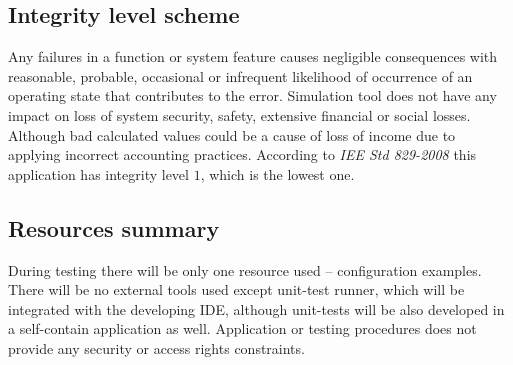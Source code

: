 \subsection{Integrity level scheme} \label{s:introduction:integrity-level-scheme}
	\begin{comment}
		$<$Describe the identified integrity level scheme for the software-based system or software product, and the mapping of the selected scheme to the integrity level scheme used in this standard. If the selected integrity level scheme is the example presented in this standard, it may be referenced and does not need to be repeated in the MTP. The MTP documents the assignment of integrity levels to individual components (e.g., requirements, functions, software modules, subsystems, non-functional characteristics, or other partitions), where there are differing integrity levels assigned within the system. At the beginning of each process, the assignment of integrity levels is reassessed with respect to changes that may need to be made in the integrity levels as a result of architecture selection, design choices, code construction, or other development activities. $>$
	\end{comment}
	Any failures in a function or system feature causes negligible consequences with reasonable, probable, occasional or infrequent likelihood of occurrence of an operating state that contributes to the error. Simulation tool does not have any impact on loss of system security, safety, extensive financial or social losses. Although bad calculated values could be a cause of loss of income due to applying incorrect accounting practices. According to \emph{IEE Std 829-2008} this application has integrity level $1$, which is the lowest one.
\subsection{Resources summary} \label{s:introduction:resources-summary}
	\begin{comment}
		$<$Summarize the test resources, including staffing, facilities, tools, and special procedural requirements (e.g., security, access rights, and documentation control). $>$
	\end{comment}
	During testing there will be only one resource used -- configuration examples. There will be no external tools used except unit-test runner, which will be integrated with the developing IDE, although unit-tests will be also developed in a self-contain application as well. Application or testing procedures does not provide any security or access rights constraints.
